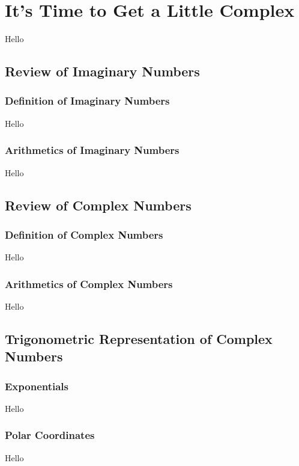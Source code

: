 \chapter{It's Time to Get a Little Complex}
Hello

\section{Review of Imaginary Numbers}
\subsection{Definition of Imaginary Numbers}
Hello

\subsection{Arithmetics of Imaginary Numbers}
Hello

\section{Review of Complex Numbers}
\subsection{Definition of Complex Numbers}
Hello

\subsection{Arithmetics of Complex Numbers}
Hello

\section{Trigonometric Representation of Complex Numbers}
\subsection{Exponentials}
Hello

\subsection{Polar Coordinates}
Hello
